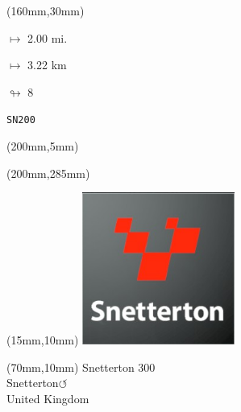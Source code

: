 \begin{textblock*}{40mm}(160mm,30mm)%
\Large
\par$\mapsto$ 2.00 mi.
\par$\mapsto$ 3.22 km
\par$\looparrowright$ 8
\par\hfill\tiny\tt SN200\\
\end{textblock*}
\begin{textblock*}{20mm}(200mm,5mm)%
\fbox{\thepage}
\label{SN200}
\end{textblock*}
\begin{textblock*}{20mm}(200mm,285mm)%
\fbox{\thepage}
\end{textblock*}

\null\newpage
\begin{textblock*}{50mm}(15mm,10mm)%
\includegraphics[width=50mm]{LG/2015-05-20_00095.png}
\end{textblock*}
\begin{textblock*}{130mm}(70mm,10mm)%
{\fontsize{20}{20}\selectfont Snetterton 300\\}
{\fontsize{16}{16}\selectfont Snetterton\hfill \huge$\circlearrowleft$\\}
{\fontsize{12}{12}\selectfont United Kingdom\\}
\end{textblock*}
